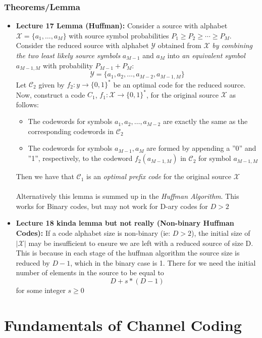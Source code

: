 \documentclass{article}
\begin{document}
\subsubsection{Theorems/Lemma}
\begin{itemize}
    \item \textbf{Lecture 17 Lemma (Huffman): } Consider a source with alphabet \(\mathcal{X} = \{a_1, \ldots, a_M\}\) with source symbol probabilities \(P_1\geq P_2 \geq \cdots \geq P_M\). Consider the reduced source with alphabet \(\mathcal{Y}\) obtained from \(\mathcal{X}\)
    \textit{by combining the two least likely source symbols} \(a_{M-1}\) and \(a_M\) into \textit{an equivalent symbol} \(a_{M-1, M}\) with probability \(P_{M-1} + P_M\):
    \[\mathcal{Y} = \{a_1, a_2, \ldots, a_{M-2}, a_{M-1, M}\}\]
    Let \(\mathcal{C}_2\) given by \(f_2: y \to \{0,1\}^*\) be an optimal code for the reduced source. Now, construct a code \(C_1\), \(f_1: \mathcal{X} \to \{0,1\}^*\), for the original source \(\mathcal{X}\) as follows:
    \begin{itemize}
        \item The codewords for symbols \(a_1, a_2, \ldots, a_{M-2}\) are exactly the same as the corresponding codewords in \(\mathcal{C}_2\)
        \item The codewords for symbols \(a_{M-1}, a_M\) are formed by appending a ''0'' and ''1'', respectively, to the codeword \(f_2(a_{M-1,M})\) in \(\mathcal{C}_2\) for symbol \(a_{M-1,M}\)
    \end{itemize}
    Then we have that \(\mathcal{C}_1\) is an \textit{optimal prefix code} for the original source \(\mathcal{X}\)
    \\ \\ Alternatively this lemma is summed up in the \textit{Huffman Algorithm}. This works for Binary codes, but may not work for D-ary codes for \(D>2\)
    \item \textbf{Lecture 18 kinda lemma but not really (Non-binary Huffman Codes): } If a code alphabet size is non-binary (ie: \(D>2\)), the initial size of \(|\mathcal{X}|\) may be insufficient to ensure we are left with a reduced source of size D.
    This is because in each stage of the huffman algorithm the source size is reduced by \(D-1\), which in the binary case is 1. There for we need the initial number of elements in the source to be equal to
    \[D + s*(D-1)\]
    for some integer \(s\geq0\)
\end{itemize}

\section{Fundamentals of Channel Coding}
\end{document}
